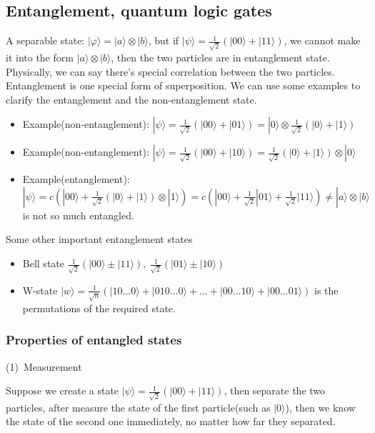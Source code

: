 \documentclass[UTF8,12pt]{article} %
\begin{document}
\subsection{Entanglement, quantum logic gates}
A separable state: $|\varphi\rangle = |a\rangle\otimes|b\rangle$, but if $|\psi\rangle = \frac{1}{\sqrt{2}}\left(|00\rangle + |11\rangle\right)$, we cannot make it into the form $|a\rangle\otimes|b\rangle$, then the two particles are in entanglement state. Physically, we can say there's special correlation between the two particles. Entanglement is one special form of superposition. We can use some examples to clarify the entanglement and the non-entanglement state.
\begin{itemize}
\item Example(non-entanglement): $|\psi\rangle = \frac{1}{\sqrt{2}}\left(|00\rangle + |01\rangle\right) = |0\rangle\otimes\frac{1}{\sqrt{2}}\left(|0\rangle + |1\rangle\right)$
\item Example(non-entanglement): $|\psi\rangle = \frac{1}{\sqrt{2}}\left(|00\rangle + |10\rangle\right) = \frac{1}{\sqrt{2}}\left(|0\rangle + |1\rangle\right)\otimes|0\rangle$
\item Example(entanglement): \\
$|\psi\rangle = c\left(|00\rangle + \frac{1}{\sqrt{2}}(|0\rangle + |1\rangle)\otimes|1\rangle\right) = c\left(|00\rangle + \frac{1}{\sqrt{2}}|01\rangle + \frac{1}{\sqrt{2}}|11\rangle\right) \ne |a\rangle\otimes|b\rangle$ is not so much entangled.
\end{itemize}
Some other important entanglement states
\begin{itemize}
\item Bell state $\frac{1}{\sqrt{2}}\left(|00\rangle \pm |11\rangle\right),~\frac{1}{\sqrt{2}}\left(|01\rangle \pm|10\rangle\right)$
\item W-state $|w\rangle = \frac{1}{\sqrt{n}}\left(|10...0\rangle + |010...0\rangle + ... + |00...10\rangle + |00...01\rangle\right)$ is the permutations of the required state.
\end{itemize}

\subsubsection{Properties of entangled states}

(1)~Measurement

Suppose we create a state $|\psi\rangle = \frac{1}{\sqrt{2}}\left(|00\rangle + |11\rangle\right)$, then separate the two particles, after measure the state of the first particle(such as $|0\rangle$), then we know the state of the second one immediately, no matter how far they separated.\\
\end{document}
